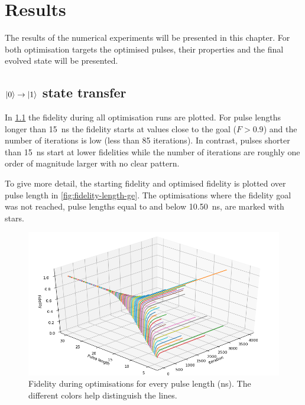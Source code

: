 \documentclass[main.tex]{subfiles}
\begin{document}
\chapter{Results}
The results of the numerical experiments will be presented in this chapter. For both optimisation targets the optimised pulses, their properties and the final evolved state will be presented.


\section{\texorpdfstring{\boldmath\(\ket{0}\rightarrow\ket{1}\)}{0 -> 1} state transfer}
In \cref{fig:3d-optim-ge} the fidelity during all optimisation runs are plotted.
For pulse lengths longer than \SI{15}{\nano\second} the fidelity starts at values close to the goal (\(F>0.9\)) and the number of iterations is low (less than 85 iterations).
In contrast, pulses shorter than \SI{15}{\nano\second} start at lower fidelities while the number of iterations are roughly one order of magnitude larger with no clear pattern.

To give more detail, the starting fidelity and optimised fidelity is plotted over pulse length in \cref{fig:fidelity-length-ge}.
The optimisations where the fidelity goal was not reached, pulse lengths equal to and below \SI{10.50}{\nano\second}, are marked with stars.

\begin{figure}
    \centering
    \includegraphics[width=\linewidth]{figs/3d-optim-ge.png}
    \caption{Fidelity during optimisations for every pulse length (ns). The different colors help distinguish the lines.}
    \label{fig:3d-optim-ge}
\end{figure}
\end{document}
